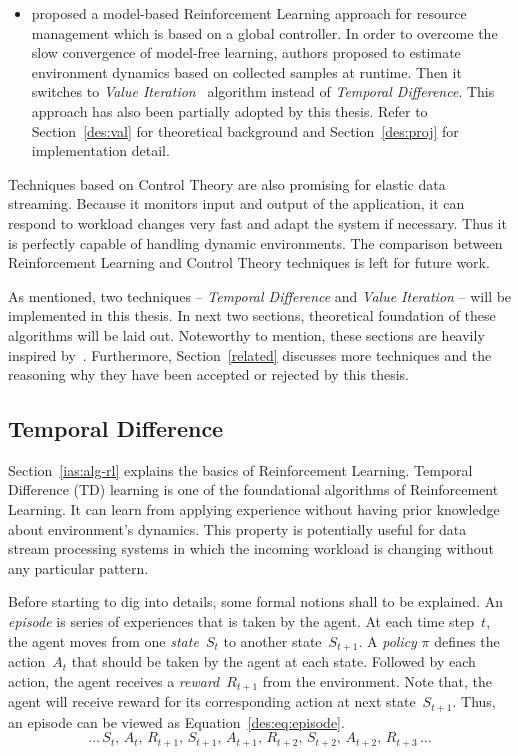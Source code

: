 \begin{description}[leftmargin=0pt]
\begin{itemize}
        \item \textcite{dutreilh:hal-01122123} proposed a model-based Reinforcement Learning approach for resource management which is based on a global controller. In order to overcome the slow convergence of model-free learning, authors proposed to estimate environment dynamics based on collected samples at runtime. Then it switches to \emph{Value Iteration}~\cite{rlIntro} algorithm instead of \emph{Temporal Difference}. This approach has also been partially adopted by this thesis. Refer to Section~\ref{des:val} for theoretical background and Section~\ref{des:proj} for implementation detail.
    \end{itemize}
    \item[Control Theory] Techniques based on Control Theory are also promising for elastic data streaming. Because it monitors input and output of the application, it can respond to workload changes very fast and adapt the system if necessary. Thus it is perfectly capable of handling dynamic environments. The comparison between Reinforcement Learning and Control Theory techniques is left for future work.
\end{description}
As mentioned, two techniques -- \emph{Temporal Difference} and \emph{Value Iteration} -- will be implemented in this thesis. In next two sections, theoretical foundation of these algorithms will be laid out. Noteworthy to mention, these sections are heavily inspired by~\textcite{rlIntro}. Furthermore, Section~\ref{related} discusses more techniques and the reasoning why they have been accepted or rejected by this thesis.

\subsection{Temporal Difference}
\label{des:temp}
Section~\ref{ias:alg-rl} explains the basics of Reinforcement Learning. Temporal Difference (TD) learning is one of the foundational algorithms of Reinforcement Learning. It can learn from applying experience without having prior knowledge about environment's dynamics. This property is potentially useful for data stream processing systems in which the incoming workload is changing without any particular pattern.

Before starting to dig into details, some formal notions shall to be explained. An \emph{episode} is series of experiences that is taken by the agent. At each time step~$t$, the agent moves from one \emph{state}~$S_t$ to another state~$S_{t+1}$. A \emph{policy} $\pi$ defines the action~$A_t$ that should be taken by the agent at each state. Followed by each action, the agent receives a \emph{reward}~$R_{t+1}$ from the environment. Note that, the agent will receive reward for its corresponding action at next state~$S_{t+1}$. Thus, an episode can be viewed as Equation~\ref{des:eq:episode}.
\begin{equation}
\dots\,S_t,\,A_t,\,R_{t+1},\,S_{t+1},\,A_{t+1},\,R_{t+2},\,S_{t+2},\,A_{t+2},\,R_{t+3}\,\dots
\label{des:eq:episode}
\end{equation}

